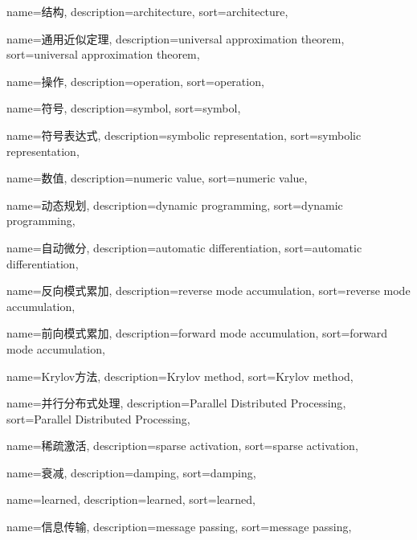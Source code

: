 {
  name=结构,
  description={architecture},
  sort={architecture},
}

{
  name=通用近似定理, %
  description={universal approximation theorem},
  sort={universal approximation theorem},
}

{
  name=操作,
  description={operation},
  sort={operation},
}

{
  name=符号,
  description={symbol},
  sort={symbol},
}

{
  name=符号表达式,
  description={symbolic representation},
  sort={symbolic representation},
}

{
  name=数值,
  description={numeric value},
  sort={numeric value},
}

{
  name=动态规划,
  description={dynamic programming},
  sort={dynamic programming},
}

{
  name=自动微分,
  description={automatic differentiation},
  sort={automatic differentiation},
}

{
  name=反向模式累加,
  description={reverse mode accumulation},
  sort={reverse mode accumulation},
}

{
  name=前向模式累加,
  description={forward mode accumulation},
  sort={forward mode accumulation},
}

{
  name=Krylov方法,
  description={Krylov method},
  sort={Krylov method},
}

{
  name=并行分布式处理,
  description={Parallel Distributed Processing},
  sort={Parallel Distributed Processing},
}

{
  name=稀疏激活,
  description={sparse activation},
  sort={sparse activation},
}

{
  name=衰减,
  description={damping},
  sort={damping},
}

{
  name=learned,
  description={learned},
  sort={learned},
}

{
  name=信息传输,
  description={message passing},
  sort={message passing},
}

